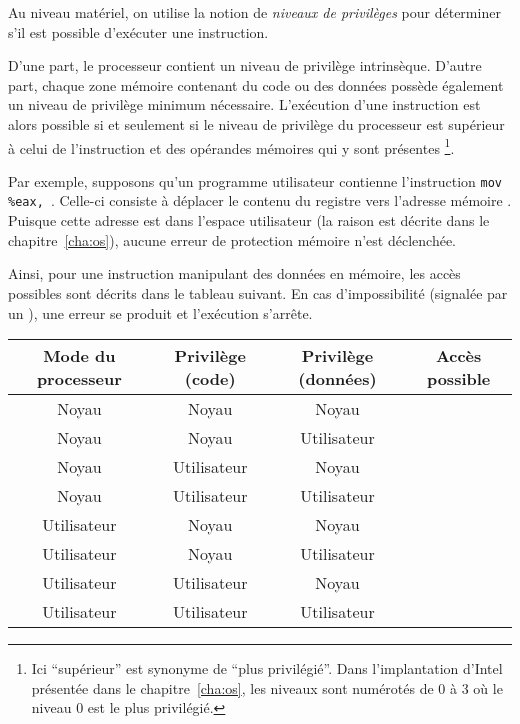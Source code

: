Au niveau matériel, on utilise la notion de \emph{niveaux de privilèges} pour
déterminer s'il est possible d'exécuter une instruction.

D'une part, le processeur contient un niveau de privilège intrinsèque. D'autre
part, \linebreak chaque zone mémoire contenant du code ou des données possède
également un niveau de privilège minimum nécessaire. L'exécution d'une
instruction est alors possible si et seulement si le niveau de privilège du
processeur est supérieur à celui de l'instruction et des opérandes mémoires qui
y sont présentes
\footnote{
  Ici ``supérieur'' est synonyme de ``plus privilégié''. Dans l'implantation
  d'Intel présentée dans le chapitre~\ref{cha:os}, les niveaux sont numérotés de
  0 à 3 où le niveau 0 est le plus privilégié.
}.

Par exemple, supposons qu'un programme utilisateur contienne l'instruction
\texttt{mov \%eax, }. Celle-ci consiste à déplacer le contenu du
registre \eax{} vers l'adresse mémoire \texttt{}. Puisque cette
adresse est dans l'espace utilisateur (la raison est décrite dans le
chapitre~\ref{cha:os}), aucune erreur de protection mémoire n'est déclenchée.

Ainsi, pour une instruction manipulant des données en mémoire, les accès
possibles sont décrits dans le tableau suivant. En cas d'impossibilité (signalée
par un \Square), une erreur se produit et l'exécution s'arrête.

\begin{center}
\def\modeK{Noyau\xspace}
\def\modeU{Utilisateur\xspace}
\begin{tabular}{cccc}
\toprule
  Mode du processeur
& Privilège (code)
& Privilège (données)
& Accès possible \\
\midrule
  \modeK{} & \modeK{} & \modeK{} & \CheckedBox{} \\
  \modeK{} & \modeK{} & \modeU{} & \CheckedBox{} \\
  \modeK{} & \modeU{} & \modeK{} & \CheckedBox{} \\
  \modeK{} & \modeU{} & \modeU{} & \CheckedBox{} \\
  \modeU{} & \modeK{} & \modeK{} & \Square{} \\
  \modeU{} & \modeK{} & \modeU{} & \Square{} \\
  \modeU{} & \modeU{} & \modeK{} & \Square{} \\
  \modeU{} & \modeU{} & \modeU{} & \CheckedBox{} \\
\bottomrule
\end{tabular}
\end{center}
\label{page:erreursec}

